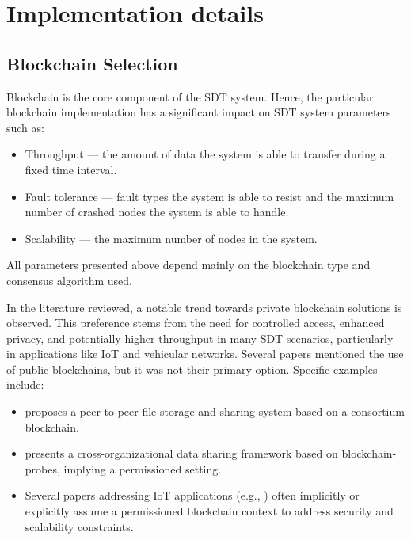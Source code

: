 \documentclass[10pt]{llncs}
\begin{document}
\section{Implementation details} \label{implementation_details}

\subsection{Blockchain Selection}

Blockchain is the core component of the SDT system.
Hence, the particular blockchain implementation has a significant impact on SDT system parameters such as:

\begin{itemize}
    \item Throughput --- the amount of data the system is able to transfer during a fixed time interval.
    \item Fault tolerance --- fault types the system is able to resist and the maximum number of crashed nodes the system is able to handle.
    \item Scalability --- the maximum number of nodes in the system.
\end{itemize}

All parameters presented above depend mainly on the blockchain type and consensus algorithm used.

In the literature reviewed, a notable trend towards private blockchain solutions is observed.
This preference stems from the need for controlled access, enhanced privacy, and potentially higher throughput in many SDT scenarios, particularly in applications like IoT and vehicular networks. 
Several papers mentioned the use of public blockchains, but it was not their primary option. 
Specific examples include:

\begin{itemize}
    \item \cite{Peng2023} proposes a peer-to-peer file storage and sharing system based on a consortium blockchain.
    \item \cite{Jia2023} presents a cross-organizational data sharing framework based on blockchain-probes, implying a permissioned setting.
    \item Several papers addressing IoT applications (e.g., \cite{Ai2022,Gupta2022}) often implicitly or explicitly assume a permissioned blockchain context to address security and scalability constraints.
\end{itemize}
\end{document}
